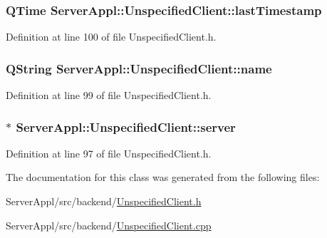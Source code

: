 \subsubsection[{last\+Timestamp}]{\setlength{\rightskip}{0pt plus 5cm}Q\+Time Server\+Appl\+::\+Unspecified\+Client\+::last\+Timestamp\hspace{0.3cm}{\ttfamily [protected]}}\label{class_server_appl_1_1_unspecified_client_a243b627d332e06cd922148b7008af97e}


Definition at line 100 of file Unspecified\+Client.\+h.

\hypertarget{class_server_appl_1_1_unspecified_client_a66f3dc8bd71e34f52ad02f692808593c}{}
\subsubsection[{name}]{\setlength{\rightskip}{0pt plus 5cm}Q\+String Server\+Appl\+::\+Unspecified\+Client\+::name\hspace{0.3cm}{\ttfamily [protected]}}\label{class_server_appl_1_1_unspecified_client_a66f3dc8bd71e34f52ad02f692808593c}


Definition at line 99 of file Unspecified\+Client.\+h.

\hypertarget{class_server_appl_1_1_unspecified_client_aed25c6192d4e27602c2bf4f0721360b5}{}
\subsubsection[{server}]{$\ast$ Server\+Appl\+::\+Unspecified\+Client\+::server\hspace{0.3cm}{\ttfamily [protected]}}\label{class_server_appl_1_1_unspecified_client_aed25c6192d4e27602c2bf4f0721360b5}


Definition at line 97 of file Unspecified\+Client.\+h.



The documentation for this class was generated from the following files\+:\begin{DoxyCompactItemize}
\item 
Server\+Appl/src/backend/\hyperlink{_unspecified_client_8h}{Unspecified\+Client.\+h}\item 
Server\+Appl/src/backend/\hyperlink{_unspecified_client_8cpp}{Unspecified\+Client.\+cpp}\end{DoxyCompactItemize}
